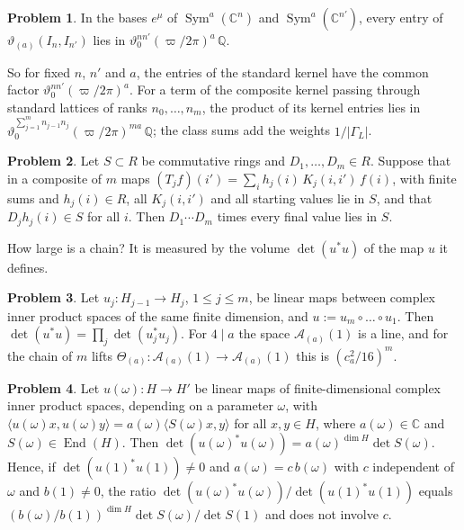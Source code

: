 \documentclass[reqno]{amsart}
\theoremstyle{definition}
\newtheorem{problem}{Problem}[section]
\theoremstyle{plain}
\newcommand{\Q}{\mathbb{Q}}
\newcommand{\C}{\mathbb{C}}
\newcommand{\Ac}{\mathcal{A}}
\newcommand{\Sym}{\operatorname{Sym}}
\begin{document}
\begin{problem}\label{pr:rational}
In the bases \(e^\mu\) of \(\Sym^a(\C^n)\) and \(\Sym^a(\C^{n'})\), every entry of \(\vartheta_{(a)}(I_n, I_{n'})\) lies in \(\vartheta_0^{nn'} (\varpi/2\pi)^a\, \Q\).
\end{problem}

So for fixed \(n\), \(n'\) and \(a\), the entries of the standard kernel have the common factor \(\vartheta_0^{nn'}(\varpi/2\pi)^a\).  For a term of the composite kernel passing through standard lattices of ranks \(n_0, \dots, n_m\), the product of its kernel entries lies in \(\vartheta_0^{\sum_{j=1}^m n_{j-1}n_j}(\varpi/2\pi)^{ma}\,\Q\); the class sums add the weights \(1/\lvert\Gamma_L\rvert\).

\begin{problem}\label{pr:clear}
Let \(S \subset R\) be commutative rings and \(D_1, \dots, D_m \in R\).  Suppose that in a composite of \(m\) maps \((T_j f)(i') = \sum_i h_j(i)\, K_j(i, i')\, f(i)\), with finite sums and \(h_j(i) \in R\), all \(K_j(i,i')\) and all starting values lie in \(S\), and that \(D_j h_j(i) \in S\) for all \(i\).  Then \(D_1 \cdots D_m\) times every final value lies in \(S\).
\end{problem}

How large is a chain?  It is measured by the volume \(\det(u^*u)\) of the map \(u\) it defines.

\begin{problem}\label{pr:det-compose}
Let \(u_j \colon H_{j-1} \to H_j\), \(1 \le j \le m\), be linear maps between complex inner product spaces of the same finite dimension, and \(u := u_m \circ \dots \circ u_1\).  Then \(\det(u^*u) = \prod_j \det(u_j^*u_j)\).  For \(4 \mid a\) the space \(\Ac_{(a)}(1)\) is a line, and for the chain of \(m\) lifts \(\Theta_{(a)} \colon \Ac_{(a)}(1) \to \Ac_{(a)}(1)\) this is \((c_a^2/16)^m\).
\end{problem}

\begin{problem}\label{pr:det-ratio}
Let \(u(\omega) \colon H \to H'\) be linear maps of finite-dimensional complex inner product spaces, depending on a parameter \(\omega\), with \(\langle u(\omega)x, u(\omega)y\rangle = a(\omega)\langle S(\omega)x, y\rangle\) for all \(x, y \in H\), where \(a(\omega) \in \C\) and \(S(\omega) \in \operatorname{End}(H)\).  Then \(\det(u(\omega)^*u(\omega)) = a(\omega)^{\dim H}\det S(\omega)\).  Hence, if \(\det(u(1)^*u(1)) \ne 0\) and \(a(\omega) = c\, b(\omega)\) with \(c\) independent of \(\omega\) and \(b(1) \ne 0\), the ratio \(\det(u(\omega)^*u(\omega))/\det(u(1)^*u(1))\) equals \((b(\omega)/b(1))^{\dim H}\det S(\omega)/\det S(1)\) and does not involve \(c\).
\end{problem}
\end{document}

